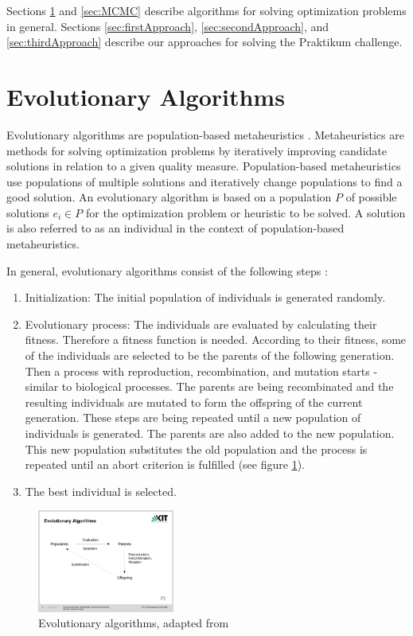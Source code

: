\documentclass[10pt,twocolumn,letterpaper]{article}
\begin{document}
Sections \ref{sec:EA} and \ref{sec:MCMC} describe algorithms for solving optimization problems in general. Sections \ref{sec:firstApproach}, \ref{sec:secondApproach}, and \ref{sec:thirdApproach} describe our approaches for solving the Praktikum challenge.


\section{Evolutionary Algorithms} \label{sec:EA}

Evolutionary algorithms are population-based metaheuristics \cite{EA}. Metaheuristics are methods for solving optimization problems by iteratively improving candidate solutions in relation to a given quality measure.
Population-based metaheuristics use populations of multiple solutions and iteratively change populations to find a good solution.
An evolutionary algorithm is based on a population $P$ of possible solutions $e_i \in P$ for the optimization problem or heuristic to be solved. A solution is also referred to as an individual in the context of population-based metaheuristics.

In general, evolutionary algorithms consist of the following steps \cite{EA}:

\begin{enumerate}
\item Initialization: The initial population of individuals is generated randomly.

\item Evolutionary process: The individuals are evaluated by calculating their fitness. Therefore a fitness function is needed.
According to their fitness, some of the individuals are selected to be the parents of the following generation.
Then a process with reproduction, recombination, and mutation starts - similar to biological processes.
The parents are being recombinated and the resulting individuals are mutated to form the offspring of the current generation.
These steps are being repeated until a new population of individuals is generated. The parents are also added to the new population. This new population substitutes the old population and the process is repeated until an abort criterion is fulfilled  (see figure \ref{fig:EA}).

\item The best individual is selected.
\end{enumerate}


\begin{figure}
	\begin{center}
		\includegraphics[trim = 2.2cm 6cm 4.1cm 6cm, clip, width=0.4\textwidth]{EA}
	\end{center}
	\caption{Evolutionary algorithms, adapted from \cite{EA}}
	\label{fig:EA}
\end{figure}
\end{document}
